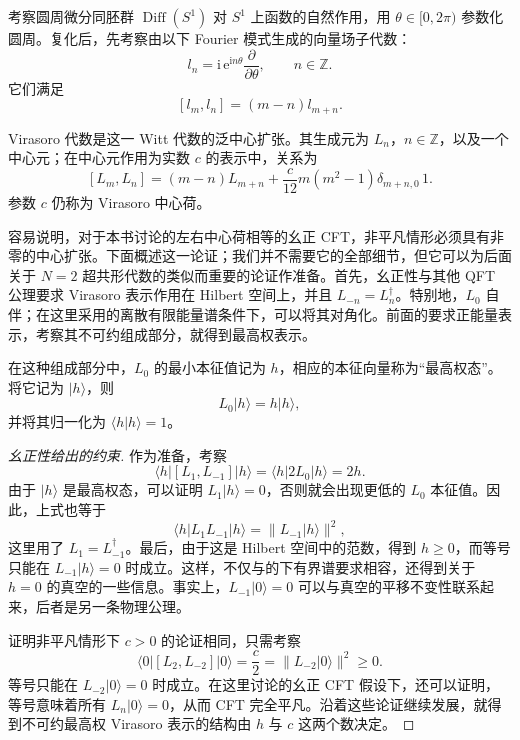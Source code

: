 考察圆周微分同胚群 $\operatorname{Diff}(S^1)$ 对 $S^1$ 上函数的自然作用，用 $\theta\in[0,2\pi)$ 参数化圆周。复化后，先考察由以下 Fourier 模式生成的向量场子代数：
\begin{equation}\label{eq:3.30}
l_n=\mathrm{i}\,\mathrm{e}^{\mathrm{i}n\theta}
\frac{\partial}{\partial\theta},\qquad n\in\mathbb{Z}.
\end{equation}
它们满足
\begin{equation}\label{eq:3.31}
[l_m,l_n]=(m-n)l_{m+n}.
\end{equation}
\begin{definition*}\label{def:3.vir}
Virasoro 代数是这一 Witt 代数的泛中心扩张。其生成元为 $L_n$，$n\in\mathbb{Z}$，以及一个中心元；在中心元作用为实数 $c$ 的表示中，关系为
\begin{equation}\label{eq:3.32}
[L_m,L_n]=(m-n)L_{m+n}
+\frac{c}{12}m(m^2-1)\delta_{m+n,0}\,1.
\end{equation}
参数 $c$ 仍称为 Virasoro 中心荷。
\end{definition*}

容易说明，对于本书讨论的左右中心荷相等的幺正 CFT，非平凡情形必须具有非零的中心扩张。下面概述这一论证；我们并不需要它的全部细节，但它可以为后面关于 $N=2$ 超共形代数的类似而重要的论证作准备。首先，幺正性与其他 QFT 公理要求 Virasoro 表示作用在 Hilbert 空间上，并且 $L_{-n}=L_n^\dagger$。特别地，$L_0$ 自伴；在这里采用的离散有限能量谱条件下，可以将其对角化。前面的要求正能量表示，考察其不可约组成部分，就得到最高权表示。
\begin{definition*}\label{def:3.highest-weight}
在这种组成部分中，$L_0$ 的最小本征值记为 $h$，相应的本征向量称为“最高权态”\footnotemark。将它记为 $|h\rangle$，则
\begin{equation}\label{eq:3.33}
L_0|h\rangle=h|h\rangle,
\end{equation}
并将其归一化为 $\langle h|h\rangle=1$。
\end{definition*}

\begin{proof}[幺正性给出的约束]
作为准备，考察
\[
\langle h|[L_1,L_{-1}]|h\rangle
=\langle h|2L_0|h\rangle=2h.
\]
由于 $|h\rangle$ 是最高权态，可以证明 $L_1|h\rangle=0$，否则就会出现更低的 $L_0$ 本征值。因此，上式也等于
\[
\langle h|L_1L_{-1}|h\rangle
=\|L_{-1}|h\rangle\|^2,
\]
这里用了 $L_1=L_{-1}^\dagger$。最后，由于这是 Hilbert 空间中的范数，得到 $h\ge0$，而等号只能在 $L_{-1}|h\rangle=0$ 时成立。这样，不仅与的下有界谱要求相容，还得到关于 $h=0$ 的真空的一些信息。事实上，$L_{-1}|0\rangle=0$ 可以与真空的平移不变性联系起来，后者是另一条物理公理。

证明非平凡情形下 $c>0$ 的论证相同，只需考察
\[
\langle0|[L_2,L_{-2}]|0\rangle
=\frac c2
=\|L_{-2}|0\rangle\|^2\ge0.
\]
等号只能在 $L_{-2}|0\rangle=0$ 时成立。在这里讨论的幺正 CFT 假设下，还可以证明，等号意味着所有 $L_n|0\rangle=0$，从而 CFT 完全平凡。沿着这些论证继续发展，就得到不可约最高权 Virasoro 表示的结构由 $h$ 与 $c$ 这两个数决定。
\end{proof}

